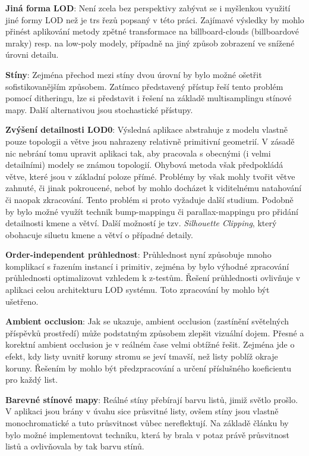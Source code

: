 {\bf Jiná forma LOD}: 
Není zcela bez perspektivy zabývat se i myšlenkou využití jiné formy LOD než je trs řezů popsaný v této práci. Zajímavé výsledky by mohlo přinést aplikování metody zpětné transformace na billboard-clouds (billboardové mraky) resp. na low-poly modely, případně na jiný způsob zobrazení ve snížené úrovni detailu.

%
{\bf Stíny}: 
Zejména přechod mezi stíny dvou úrovní by bylo možné ošetřit sofistikovanějším způsobem. Zatímco představený přístup řeší tento problém pomocí ditheringu, lze si představit i řešení na základě multisamplingu stínové mapy. Další alternativou jsou stochastické přístupy.

{\bf Zvýšení detailnosti LOD0}: 
Výsledná aplikace abstrahuje z modelu vlastně pouze topologii a větve jsou nahrazeny relativně primitivní geometrií. V zásadě nic nebrání tomu upravit aplikaci tak, aby pracovala s obecnými (i velmi detailními) modely se známou topologií. Ohybová metoda však předpokládá větve, které jsou v základní poloze přímé. Problémy by však mohly tvořit větve zahnuté, či jinak pokroucené, neboť by mohlo docházet k viditelnému natahování či naopak zkracování. Tento problém si proto vyžaduje další studium. Podobně by bylo možné využít technik bump-mappingu či parallax-mappingu pro přidání detailnosti kmene a větví. Další možností je tzv. \emph{Silhouette Clipping}, který obohacuje siluetu kmene a větví o případné detaily.

{\bf Order-independent průhlednost}: 
Průhlednost nyní způsobuje mnoho komplikací s řazením instancí i primitiv, zejména by bylo výhodné zpracování průhlednosti optimalizovat vzhledem k z-testům. Řešení průhlednosti ovlivňuje v aplikaci celou architekturu LOD systému. Toto zpracování by mohlo být ušetřeno.

{\bf Ambient occlusion}: 
Jak se ukazuje, ambient occlusion (zastínění světelných příspěvků prostředí) může podstatným způsobem zlepšit vizuální dojem. Přesné a korektní ambient occlusion je v reálném čase velmi obtížné řešit. Zejména jde o efekt, kdy listy uvnitř koruny stromu se jeví tmavší, než listy poblíž okraje koruny. Řešením by mohlo být předzpracování a určení příslušného koeficientu pro každý list. 

{\bf Barevné stínové mapy}: 
Reálné stíny přebírají barvu listů, jimiž světlo prošlo. V aplikaci jsou brány v úvahu sice průsvitné listy, ovšem stíny jsou vlastně monochromatické a tuto průsvitnost vůbec nereflektují. Na základě článku \cite{McGuire11CSSM} by bylo možné implementovat techniku, která by brala v potaz právě průsvitnost listů a ovlivňovala by tak barvu stínů.  
